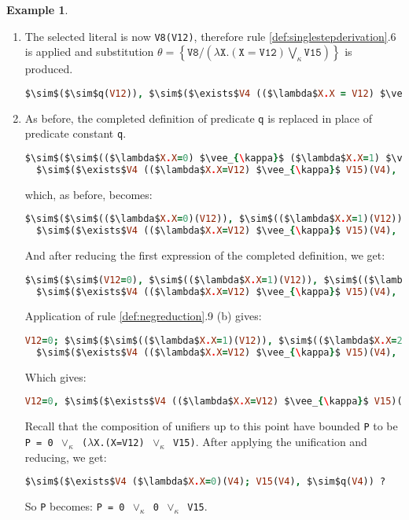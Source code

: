 \documentclass[inscr,ack,preface]{dithesis}
\theoremstyle{definition}
\newtheorem{example}{Example}[chapter]
\newcommand{\msf}[1]{$\mathsf{#1}$}
\begin{document}
\begin{example}
\begin{enumerate}
\item The selected literal is now \texttt{V8(V12)}, therefore rule \ref{def:singlestepderivation}.6 is applied and substitution \msf{\theta = \left\{ \texttt{V8} / \left( \lambda \texttt{X}. (\texttt{X} = \texttt{V12}) \bigvee_{\kappa} \texttt{V15} \right) \right\}} is produced.
\begin{lstlisting}[language=Prolog,%
  frame=single,breaklines=false,mathescape=true]
  $\sim$($\sim$q(V12)), $\sim$($\exists$V4 (($\lambda$X.X = V12) $\vee_{\kappa}$ V15)(V4), $\sim$q(V4)) ?
\end{lstlisting}

\item As before, the completed definition of predicate \msf{q} is replaced in place of predicate constant \texttt{q}.
\begin{lstlisting}[language=Prolog,%
  frame=single,breaklines=false,mathescape=true]
  $\sim$($\sim$(($\lambda$X.X=0) $\vee_{\kappa}$ ($\lambda$X.X=1) $\vee_{\kappa}$ ($\lambda$X.X=2))(V12)),
  $\sim$($\exists$V4 (($\lambda$X.X=V12) $\vee_{\kappa}$ V15)(V4), $\sim$q(V4)) ?
\end{lstlisting}
which, as before, becomes:
\begin{lstlisting}[language=Prolog,%
  frame=single,breaklines=false,mathescape=true]
  $\sim$($\sim$(($\lambda$X.X=0)(V12)), $\sim$(($\lambda$X.X=1)(V12)), $\sim$(($\lambda$X.X=2)(V12))),
  $\sim$($\exists$V4 (($\lambda$X.X=V12) $\vee_{\kappa}$ V15)(V4), $\sim$q(V4)) ?
\end{lstlisting}
And after reducing the first expression of the completed definition, we get:
\begin{lstlisting}[language=Prolog,%
  frame=single,breaklines=false,mathescape=true]
  $\sim$($\sim$(V12=0), $\sim$(($\lambda$X.X=1)(V12)), $\sim$(($\lambda$X.X=2)(V12))),
  $\sim$($\exists$V4 (($\lambda$X.X=V12) $\vee_{\kappa}$ V15)(V4), $\sim$q(V4)) ?
\end{lstlisting}
Application of rule \ref{def:negreduction}.9 (b) gives:
\begin{lstlisting}[language=Prolog,%
  frame=single,breaklines=false,mathescape=true]
  V12=0; $\sim$($\sim$(($\lambda$X.X=1)(V12)), $\sim$(($\lambda$X.X=2)(V12))),
  $\sim$($\exists$V4 (($\lambda$X.X=V12) $\vee_{\kappa}$ V15)(V4), $\sim$q(V4)) ?
\end{lstlisting}
Which gives:
\begin{lstlisting}[language=Prolog,%
  frame=single,breaklines=false,mathescape=true]
  V12=0, $\sim$($\exists$V4 (($\lambda$X.X=V12) $\vee_{\kappa}$ V15)(V4), $\sim$q(V4)) ?
\end{lstlisting}
Recall that the composition of unifiers up to this point have bounded \texttt{P} to be \texttt{P = 0 $\vee_{\kappa}$ ($\lambda$X.(X=V12) $\vee_{\kappa}$ V15)}. After applying the unification and reducing, we get:
\begin{lstlisting}[language=Prolog,%
  frame=single,breaklines=false,mathescape=true]
$\sim$($\exists$V4 ($\lambda$X.X=0)(V4); V15(V4), $\sim$q(V4)) ?
\end{lstlisting}
So \texttt{P} becomes: \texttt{P = 0 $\vee_{\kappa}$ 0 $\vee_{\kappa}$ V15}.


\end{enumerate}
\end{example}
\end{document}
